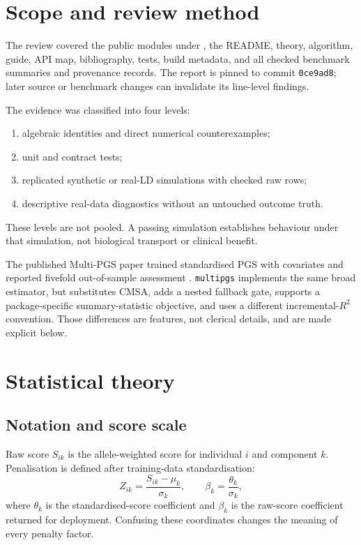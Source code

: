 \documentclass[10pt,a4paper]{article}
\newcommand{\pkg}[1]{\texttt{#1}}
\newcommand{\code}[1]{\texttt{#1}}
\newcommand{\Rtwo}{\(R^2\)}
\begin{document}
\clearpage
\tableofcontents
\clearpage
{}

\section{Scope and review method}
\label{sec:scope}

The review covered the public modules under , the README,
theory, algorithm, guide, API map, bibliography, tests, build metadata, and all
checked benchmark summaries and provenance records. The report is pinned to
commit \code{0ce9ad8}; later source or benchmark changes can invalidate its
line-level findings.

The evidence was classified into four levels:
\begin{enumerate}
  \item algebraic identities and direct numerical counterexamples;
  \item unit and contract tests;
  \item replicated synthetic or real-LD simulations with checked raw rows;
  \item descriptive real-data diagnostics without an untouched outcome truth.
\end{enumerate}
These levels are not pooled. A passing simulation establishes behaviour under
that simulation, not biological transport or clinical benefit.

The published Multi-PGS paper trained standardised PGS with covariates and
reported fivefold out-of-sample assessment \cite{albinana2023}. \pkg{multipgs}
implements the same broad estimator, but substitutes CMSA, adds a nested
fallback gate, supports a package-specific summary-statistic objective, and
uses a different incremental-\Rtwo{} convention. Those differences are
features, not clerical details, and are made explicit below.

\section{Statistical theory}
\label{sec:theory}

\subsection{Notation and score scale}

Raw score \(S_{ik}\) is the allele-weighted score for individual \(i\) and
component \(k\). Penalisation is defined after training-data standardisation:
\begin{equation}
  Z_{ik}=\frac{S_{ik}-\mu_k}{\sigma_k},
  \qquad
  \beta_k=\frac{\theta_k}{\sigma_k},
  \label{eq:standardization}
\end{equation}
where \(\theta_k\) is the standardised-score coefficient and \(\beta_k\) is the
raw-score coefficient returned for deployment. Confusing these coordinates
changes the meaning of every penalty factor.
\end{document}
